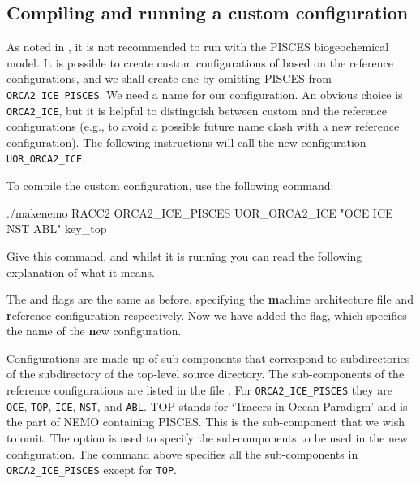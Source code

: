 \subsection{Compiling and running a custom configuration}
\label{sec:tutor-custom}

As noted in , it is not recommended to run \NEMOSIcu{} with the PISCES biogeochemical model.
It is possible to create custom configurations of \NEMOSIcu{} based on the reference configurations, and we shall create one by omitting PISCES from \mbox{\texttt{ORCA2_ICE_PISCES}}.
We need a name for our configuration.
An obvious choice is \mbox{\texttt{ORCA2_ICE}}, but it is helpful to distinguish between custom and the reference configurations (e.g., to avoid a possible future name clash with a new reference configuration).
The following instructions will call the new configuration \mbox{\texttt{UOR_ORCA2_ICE}}.

To compile the custom configuration, use the following command:

\begingroup\scriptsize
\begin{VerbatimCMD}
./makenemo  RACC2  ORCA2_ICE_PISCES  UOR_ORCA2_ICE  "OCE ICE NST ABL"  key_top
\end{VerbatimCMD}
\endgroup

Give this command, and whilst it is running you can read the following explanation of what it means.

The  and  flags are the same as before, specifying the \textbf{m}achine architecture file and \textbf{r}eference configuration respectively.
Now we have added the  flag, which specifies the name of the \textbf{n}ew configuration.

Configurations are made up of sub-components that correspond to subdirectories of the  subdirectory of the top-level source directory.
The sub-components of the reference configurations are listed in the file .
For \mbox{\texttt{ORCA2_ICE_PISCES}} they are \texttt{OCE}, \texttt{TOP}, \texttt{ICE}, \texttt{NST}, and \texttt{ABL}.
TOP stands for `Tracers in Ocean Paradigm' and is the part of NEMO containing PISCES.
This is the sub-component that we wish to omit.
The  option is used to specify the sub-components to be used in the new configuration.
The command above specifies all the sub-components in \mbox{\texttt{ORCA2_ICE_PISCES}} except for \texttt{TOP}.

